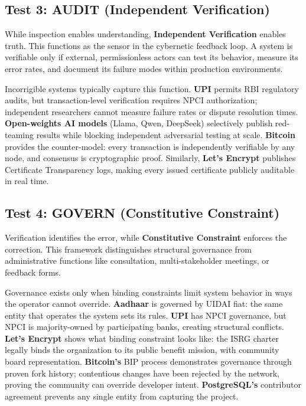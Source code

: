 \subsection{Test 3: AUDIT (Independent Verification)}

While inspection enables understanding, \textbf{Independent Verification} enables truth. This functions as the sensor in the cybernetic feedback loop. A system is verifiable only if external, permissionless actors can test its behavior, measure its error rates, and document its failure modes within production environments.

Incorrigible systems typically capture this function. \textbf{UPI} permits RBI regulatory audits, but transaction-level verification requires NPCI authorization; independent researchers cannot measure failure rates or dispute resolution times. \textbf{Open-weights AI models} (Llama, Qwen, DeepSeek) selectively publish red-teaming results while blocking independent adversarial testing at scale. \textbf{Bitcoin} provides the counter-model: every transaction is independently verifiable by any node, and consensus is cryptographic proof. Similarly, \textbf{Let's Encrypt} publishes Certificate Transparency logs, making every issued certificate publicly auditable in real time.

\subsection{Test 4: GOVERN (Constitutive Constraint)}

Verification identifies the error, while \textbf{Constitutive Constraint} enforces the correction. This framework distinguishes structural governance from administrative functions like consultation, multi-stakeholder meetings, or feedback forms.

Governance exists only when binding constraints limit system behavior in ways the operator cannot override. \textbf{Aadhaar} is governed by UIDAI fiat: the same entity that operates the system sets its rules. \textbf{UPI} has NPCI governance, but NPCI is majority-owned by participating banks, creating structural conflicts. \textbf{Let's Encrypt} shows what binding constraint looks like: the ISRG charter legally binds the organization to its public benefit mission, with community board representation. \textbf{Bitcoin's} BIP process demonstrates governance through proven fork history; contentious changes have been rejected by the network, proving the community can override developer intent. \textbf{PostgreSQL's} contributor agreement prevents any single entity from capturing the project.

